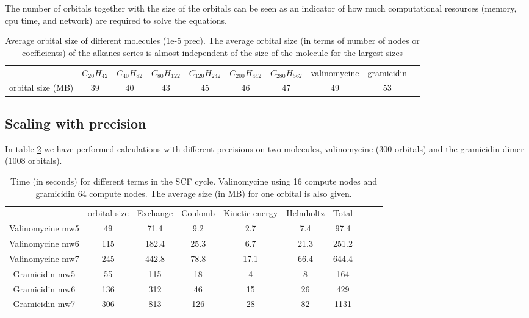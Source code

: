 \documentclass[%
 aip,
 amsmath,amssymb,
 reprint,%
]{revtex4-1}
\begin{document}
The number of orbitals together with the size of the orbitals can be seen as an indicator of how much computational resources (memory, cpu time, and network) are required to solve the equations. 

\begin{table}[t]
    \centering
    \begin{tabular}{cccccccccc}
& $C_{20}H_{42}$& $C_{40}H_{82}$& $C_{80}H_{122}$& $C_{120}H_{242}$&  $C_{200}H_{442}$ & $C_{280}H_{562}$ &valinomycine & gramicidin\\
orbital size (MB)  &  39 &  40   & 43  &  45  & 46 & 47 & 49 & 53\\
    \end{tabular}
    \caption{Average orbital size of different molecules (1e-5 prec). The average orbital size (in terms of number of nodes or coefficients) of the alkanes series is almost independent of the size of the molecule for the largest sizes}
    \label{tab:orbsizes}
\end{table}



\subsection{Scaling with precision}

In table \ref{tab:prec} we have performed calculations with different precisions on two molecules, valinomycine (300 orbitals) and the gramicidin dimer (1008 orbitals).


\begin{table}[t]
    \centering
    \begin{tabular}{cccccccccc}
&orbital size& Exchange &  Coulomb & Kinetic energy& Helmholtz & Total \\
 Valinomycine mw5& 49 & 71.4& 9.2& 2.7 & 7.4& 97.4\\
Valinomycine mw6& 115 & 182.4& 25.3& 6.7 & 21.3&251.2\\
Valinomycine mw7& 245 & 442.8& 78.8&17.1& 66.4&644.4  \\
 Gramicidin mw5&55&115&18& 4& 8& 164\\
  Gramicidin mw6&136&312 & 46& 15 & 26& 429\\
  Gramicidin mw7&306& 813&126& 28& 82& 1131\\ %
    \end{tabular}
    \caption{Time (in seconds) for different terms in the SCF cycle. Valinomycine using 16 compute nodes and gramicidin 64 compute nodes. The average size (in MB) for one orbital is also given.} %
    \label{tab:prec}
 
\end{table}
\end{document}
